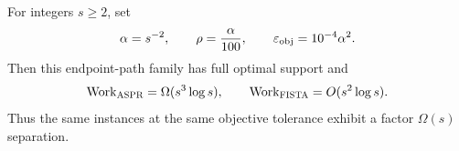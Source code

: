 \documentclass[11pt]{article}
\begin{document}
\begin{corollary}
\label{cor:quantitative-separation}
For integers $s\geq2$, set
\begin{equation}
 \alpha=s^{-2},
 \qquad
 \rho=\frac{\alpha}{100},
 \qquad
 \varepsilon_{\rm obj}=10^{-4}\alpha^2.
 \label{eq:quantitative-family}
\end{equation}
Then this endpoint-path family has full optimal support and
\begin{equation}
 \operatorname{Work}_{\textsc{ASPR}}=\Omega(s^3\log s),
 \qquad
 \operatorname{Work}_{\textsc{FISTA}}=O(s^2\log s).
 \label{eq:quantitative-separation}
\end{equation}
Thus the same instances at the same objective tolerance exhibit a factor
$\Omega(s)$ separation.
\end{corollary}
\end{document}
